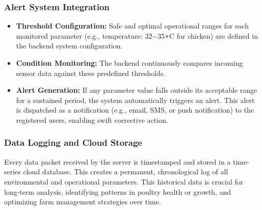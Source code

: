\documentclass[../main.tex]{subfiles}
\begin{document}
\subsubsection{ Alert System Integration}
\begin{itemize}
    \item \textbf{Threshold Configuration:} Safe and optimal operational ranges for each monitored parameter (e.g., temperature: 32−35∘C for chicken) are defined in the backend system configuration. 
    \item \textbf{ Condition Monitoring:} The backend continuously compares incoming sensor data against these predefined thresholds. 
    \item \textbf{Alert Generation:} If any parameter value falls outside its acceptable range for a sustained period, the system automatically triggers an alert. This alert is dispatched as a notification (e.g., email, SMS, or push notification) to the registered users, enabling swift corrective action.
\end{itemize}
\subsubsection{ Data Logging and Cloud Storage }
Every data packet received by the server is timestamped and stored in a time-series cloud 
database. This creates a permanent, chronological log of all environmental and operational 
parameters. This historical data is crucial for long-term analysis, identifying patterns in poultry health or growth, and optimizing farm management strategies over time.
\end{document}

